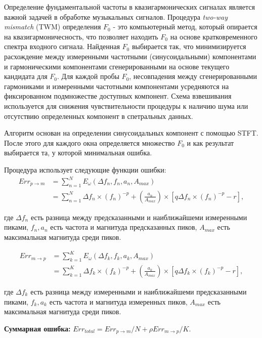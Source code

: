 Определение фундаментальной частоты в квазигармонических сигналах
является важной задачей в обработке музыкальных сигналов.
Процедура \textit{two-way mismatch} (TWM) определения $F_0$ -
это компьютерный метод, который опирается на квазигармоничесность,
что позволяет находить $F_0$ на основе кратковременного спектра входного
сигнала.
Найденная $F_0$ выбирается так, что минимизируется расхождение между
измеренными частотными (синусоидальными) компонентами и гармоническими
компонентами сгенерированными на основе текущего кандидата для $F_0$.
Для каждой пробы $F_0$, несовпадения между сгенерированными гармониками
и измеренными частотными компонентами усредняются на фиксированном
подмножестве доступных компонент. Схема взвешивания используется для
снижения чувствительности процедуры к наличию шума или отсутствию
определенных компонент в спетральных данных.

Алгоритм основан на определении синусоидальных компонент с помощью STFT.
После этого для каждого окна определяется множество $F_0$ и как результат
выбирается та, у которой минимальная ошибка.

Процедура использует следующие функции ошибки:
\begin{align}
  Err_{p \to m} &= \sum_{n=1}^N E_\omega (\Delta f_n, f_n, a_n, A_{max}) \\
                &= \sum_{n=1}^N \Delta f_n \times (f_n) ^{-p} +
                       (\frac{a_n}{A_{max}}) \times [q \Delta f_n \times
                       (f_n)^{-p} - r],
\end{align}

где $\Delta f_n$ есть разница между предсказанными и наиближайшеми измеренными
пиками, $f_n, a_n$ есть частота и магнитуда предсказанных пиков,
$A_{max}$ есть максимальная магнитуда среди пиков.

\begin{align}
  Err_{m \to p} &= \sum_{k=1}^K E_\omega (\Delta f_k, f_k, a_k, A_{max}) \\
                &= \sum_{k=1}^K \Delta f_k \times (f_k) ^{-p} +
                       (\frac{a_k}{A_{max}}) \times [q \Delta f_k \times
                       (f_k)^{-p} - r],
\end{align}

где $\Delta f_k$ есть разница между измеренными и наиближайшеми предсказанными
пиками, $f_k, a_k$ есть частота и магнитуда измеренных пиков,
$A_{max}$ есть максимальная магнитуда среди пиков.

\textbf{Суммарная ошибка:} $Err_{total} = Err_{p \to m}/N + \rho Err_{m \to p}/K$.

